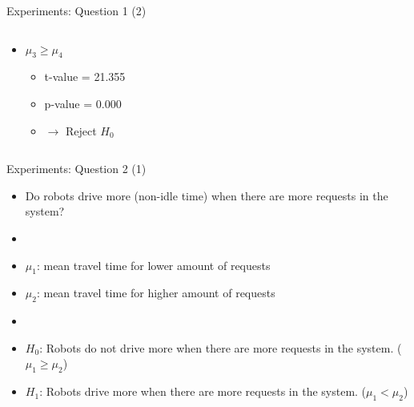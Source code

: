 \begin{frame}{Experiments: Question 1 (2)}
\begin{columns}
\begin{column}{0.5\textwidth}
\begin{itemize}
                \item $\mu_3 \geq \mu_4$
                    \begin{itemize}
                        \item t-value = 21.355
                        \item p-value = 0.000
                        \item $\rightarrow$ Reject $H_0$
                    \end{itemize}
            \end{itemize}
        \end{column}

    \end{columns}
\end{frame}



\begin{frame}{Experiments: Question 2 (1)}
    \begin{itemize}
        \item Do robots drive more (non-idle time) when there are more requests in the system?
        \item[]
        \item $\mu_1$: mean travel time for lower amount of requests
        \item $\mu_2$: mean travel time for higher amount of requests
        \item[]
        \item $H_0$: Robots do not drive more when there are more requests in the system. ($\mu_1 \geq \mu_2$)
        \item $H_1$: Robots drive more when there are more requests in the system.        ($\mu_1 < \mu_2$)
    \end{itemize}
\end{frame}

